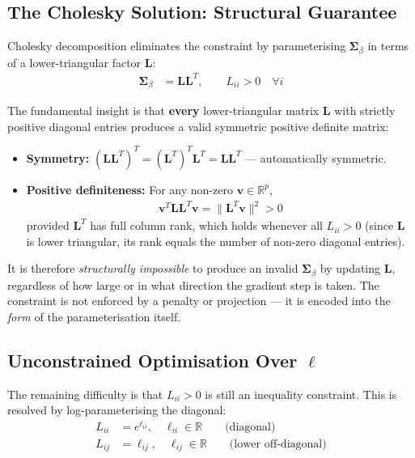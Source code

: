 \documentclass[11pt]{article}
\newcommand{\R}{\mathbb{R}}
\begin{document}
\subsection*{The Cholesky Solution: Structural Guarantee}

Cholesky decomposition eliminates the constraint by parameterising $\bm{\Sigma}_\beta$ in terms of a lower-triangular factor $\bm{L}$:
\begin{align}
  \bm{\Sigma}_\beta &= \bm{L}\bm{L}^T, \qquad L_{ii} > 0 \quad \forall i
\end{align}

The fundamental insight is that \textbf{every} lower-triangular matrix $\bm{L}$ with strictly positive diagonal entries produces a valid symmetric positive definite matrix:

\begin{itemize}
  \item \textbf{Symmetry:} $(\bm{L}\bm{L}^T)^T = (\bm{L}^T)^T\bm{L}^T = \bm{L}\bm{L}^T$ \quad --- automatically symmetric.
  \item \textbf{Positive definiteness:} For any non-zero $\bm{v} \in \R^p$,
  \begin{align}
    \bm{v}^T \bm{L}\bm{L}^T \bm{v} = \|\bm{L}^T\bm{v}\|^2 > 0
  \end{align}
  provided $\bm{L}^T$ has full column rank, which holds whenever all $L_{ii} > 0$ (since $\bm{L}$ is lower triangular, its rank equals the number of non-zero diagonal entries).
\end{itemize}

It is therefore \emph{structurally impossible} to produce an invalid $\bm{\Sigma}_\beta$ by updating $\bm{L}$, regardless of how large or in what direction the gradient step is taken. The constraint is not enforced by a penalty or projection --- it is encoded into the \emph{form} of the parameterisation itself.

\subsection*{Unconstrained Optimisation Over $\bm{\ell}$}

The remaining difficulty is that $L_{ii} > 0$ is still an inequality constraint. This is resolved by log-parameterising the diagonal:
\begin{align}
  L_{ii} &= e^{\ell_{ii}}, \quad \ell_{ii} \in \R \qquad \text{(diagonal)}\\
  L_{ij} &= \ell_{ij}, \quad \ell_{ij} \in \R \qquad \text{(lower off-diagonal)}
\end{align}
\end{document}
